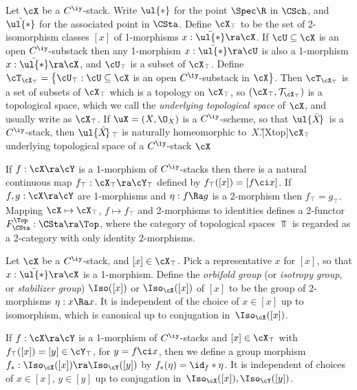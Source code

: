 \documentclass{article}
\begin{document}
\begin{dfn} Let $\cX$ be a $C^\iy$-stack. Write $\ul{*}$ for the
point $\Spec\R$ in $\CSch$, and $\bar{\ul{*}}$ for the associated
point in $\CSta$. Define $\cX_\top$ to be the set of 2-isomorphism
classes $[x]$ of 1-morphisms $x:\bar{\ul{*}}\ra\cX$. If
$\cU\subseteq\cX$ is an open $C^\iy$-substack then any 1-morphism
$x:\bar{\ul{*}}\ra\cU$ is also a 1-morphism $x:\bar{\ul{*}}\ra\cX$,
and $\cU_\top$ is a subset of $\cX_\top$. Define
$\cT_{\cX_\top}=\bigl\{\cU_\top:\cU\subseteq\cX$ is an open
$C^\iy$-substack in $\cX\bigr\}$. Then $\cT_{\cX_\top}$ is a set of
subsets of $\cX_\top$ which is a topology on $\cX_\top$, so
$(\cX_\top,{\cal T}_{\cX_\top})$ is a topological space, which we
call the {\it underlying topological space\/} of $\cX$, and usually
write as $\cX_\top$. If $\uX=(X,\O_X)$ is a $C^\iy$-scheme, so that
$\ul{\bar X\!}\,$ is a $C^\iy$-stack, then $\ul{\bar X\!}\,_\top$ is
naturally homeomorphic to~$X$.\G[Xtop]{$\cX_\top$}{underlying
topological space of a $C^\iy$-stack $\cX$}

If $f:\cX\ra\cY$ is a 1-morphism of $C^\iy$-stacks then there is a
natural continuous map $f_\top:\cX_\top\ra\cY_\top$ defined by
$f_\top([x])=[f\ci x]$. If $f,g:\cX\ra\cY$ are 1-morphisms and
$\eta:f\Ra g$ is a 2-morphism then $f_\top=g_\top$. Mapping
$\cX\mapsto\cX_\top$, $f\mapsto f_\top$ and 2-morphisms to
identities defines a 2-functor $F_\CSta^\Top:\CSta\ra\Top$, where
the category of topological spaces $\Top$ is regarded as a
2-category with only identity 2-morphisms.
\label{ds8def5}
\end{dfn}

\begin{dfn} Let $\cX$ be a $C^\iy$-stack, and $[x]\in\cX_\top$.
Pick a representative $x$ for $[x]$, so that $x:\bar{\ul{*}}\ra\cX$
is a 1-morphism. Define the {\it orbifold
group\/} (or
{\it isotropy group}, or {\it stabilizer group\/}) $\Iso([x])$ or
$\Iso_\cX([x])$ of $[x]$ to be the group of 2-morphisms $\eta:x\Ra
x$. It is independent of the choice of $x\in[x]$ up to isomorphism,
which is canonical up to conjugation in~$\Iso_\cX([x])$.

If $f:\cX\ra\cY$ is a 1-morphism of $C^\iy$-stacks and
$[x]\in\cX_\top$ with $f_\top([x])=[y]\in\cY_\top$, for $y=f\ci x$,
then we define a group morphism $f_*:\Iso_\cX([x])\ra \Iso_\cY([y])$
by $f_*(\eta)=\id_f*\eta$. It is independent of choices of
$x\in[x]$, $y\in[y]$ up to conjugation
in~$\Iso_\cX([x]),\Iso_\cY([y])$.
\label{ds8def6}
\end{dfn}
\end{document}

